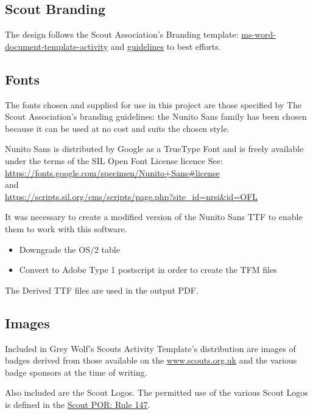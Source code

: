 \documentclass[a4paper]{GreyWolfsScoutActivityTemplate}
\begin{document}
\subsection*{Scout Branding}
The design follows the Scout Association's Branding template: \href{https://scoutsbrand.org.uk/catalogue/item/ms-word-document-template-activity}{ms-word-document-template-activity} and \href{https://docs.scoutsbrand.org.uk/guidelines.pdf}{guidelines} to best efforts.

\subsection*{Fonts}
The fonts chosen and supplied for use in this project are those specified by The Scout Association's branding guidelines: the Nunito Sans family has been chosen because it can be used at no cost and suits the chosen style.

Nunito Sans is distributed by Google as a TrueType Font and is freely
available under the terms of the SIL Open Font License licence
See:\\\href{https://fonts.google.com/specimen/Nunito+Sans\#license}{https://fonts.google.com/specimen/Nunito+Sans\#license}\\and\\\href{https://scripts.sil.org/cms/scripts/page.php?site_id=nrsi&id=OFL}{https://scripts.sil.org/cms/scripts/page.php?site\_id=nrsi\&id=OFL}

It was necessary to create a modified version of the Nunito Sans TTF to
enable them to work with this software.
\begin{itemize}
\item Downgrade the OS/2 table
\item Convert to Adobe Type 1 postscript in order to create the TFM files
\end{itemize}
The Derived TTF files are used in the output PDF.

\subsection*{Images}
Included in Grey Wolf's Scouts Activity Template's distribution are images of badges derived from those available on the \href{https://www.scouts.org.uk}{www.scouts.org.uk} and the various badge sponsors at the time of writing.

Also included are the Scout Logos. The permitted use of the various Scout Logos is defined in the \href{https://www.scouts.org.uk/por/14-other-matters/rule-147-protected-scout-logos-names-badges-and-awards/}{Scout POR: Rule 147}.
\end{document}
